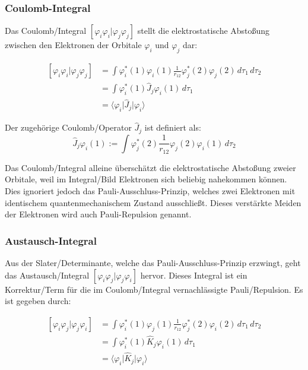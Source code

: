 \cite[S. 19]{tc2_3}

\subsubsection*{Coulomb-Integral}
Das Coulomb\-/Integral $\left[ \varphi_i \varphi_i \vert \varphi_j\varphi_j \right]$
stellt die elektrostatische Abstoßung zwischen den Elektronen der Orbitale $\varphi_i$ und $\varphi_j$ dar:

\begin{align*}
  \left[ \varphi_i \varphi_i \vert \varphi_j \varphi_j \right] &= 
  \int \varphi_i^*(1) \varphi_i(1) \frac{1}{r_{12}} \varphi_j^*(2) \varphi_j(2) \,d\tau_1 \,d\tau_2\\
  &= \int \varphi_i^*(1) \hat{J}_j \varphi_i(1) \,d\tau_1 \\ 
  &= \langle \varphi_i \vert \hat{J}_j \vert \varphi_i \rangle
\end{align*}

Der zugehörige Coulomb\-/Operator $\hat{J}_j$ ist definiert als:
\begin{equation}
  \hat{J}_j \varphi_i(1):= 
  \int \varphi_j^*(2) \frac{1}{r_{12}} \varphi_j(2) \varphi_i(1) \,d\tau_2 
\end{equation}

Das Coulomb\-/Integral alleine überschätzt die elektrostatische Abstoßung zweier Orbitale,
weil im Integral\-/Bild Elektronen sich beliebig nahekommen können.
Dies ignoriert jedoch das Pauli-Ausschluss-Prinzip, 
welches zwei Elektronen mit identischem quantenmechanischem Zustand ausschließt.
Dieses verstärkte Meiden der Elektronen wird auch Pauli-Repulsion genannt.

\cite[S. 206]{lewars_2016} \cite[S. 23]{tc2_3}

\subsubsection*{Austausch-Integral}
Aus der Slater\-/Determinante, welche das Pauli-Ausschluss-Prinzip erzwingt,
geht das Austausch\-/Integral $\left[ \varphi_i \varphi_j \vert \varphi_j\varphi_i \right]$ hervor.
Dieses Integral ist ein Korrektur\-/Term für die im Coulomb\-/Integral vernachlässigte Pauli\-/Repulsion.
Es ist gegeben durch:

\begin{align*}
  \left[ \varphi_i \varphi_j \vert \varphi_j \varphi_i \right] &= 
  \int \varphi_i^*(1) \varphi_j(1) \frac{1}{r_{12}} \varphi_j^*(2) \varphi_i(2) \,d\tau_1 \,d\tau_2\\
  &= \int \varphi_i^*(1) \hat{K}_j \varphi_i(1) \,d\tau_1 \\ 
  &= \langle \varphi_i \vert \hat{K}_j \vert \varphi_i \rangle
\end{align*}

